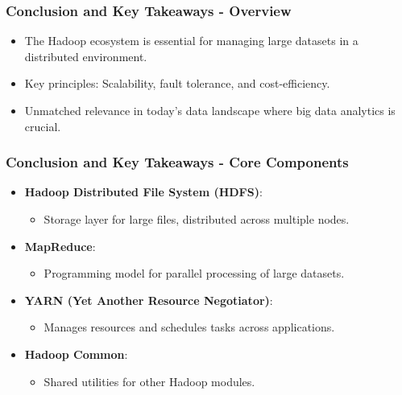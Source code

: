 \documentclass[aspectratio=169]{beamer}
\begin{document}
\begin{frame}[fragile]
    \frametitle{Conclusion and Key Takeaways - Overview}
    \begin{itemize}
        \item The Hadoop ecosystem is essential for managing large datasets in a distributed environment.
        \item Key principles: Scalability, fault tolerance, and cost-efficiency.
        \item Unmatched relevance in today's data landscape where big data analytics is crucial.
    \end{itemize}
\end{frame}

\begin{frame}[fragile]
    \frametitle{Conclusion and Key Takeaways - Core Components}
    \begin{itemize}
        \item \textbf{Hadoop Distributed File System (HDFS)}: 
        \begin{itemize}
            \item Storage layer for large files, distributed across multiple nodes.
        \end{itemize}
        \item \textbf{MapReduce}: 
        \begin{itemize}
            \item Programming model for parallel processing of large datasets.
        \end{itemize}
        \item \textbf{YARN (Yet Another Resource Negotiator)}: 
        \begin{itemize}
            \item Manages resources and schedules tasks across applications.
        \end{itemize}
        \item \textbf{Hadoop Common}: 
        \begin{itemize}
            \item Shared utilities for other Hadoop modules.
        \end{itemize}
    \end{itemize}
\end{frame}
\end{document}
